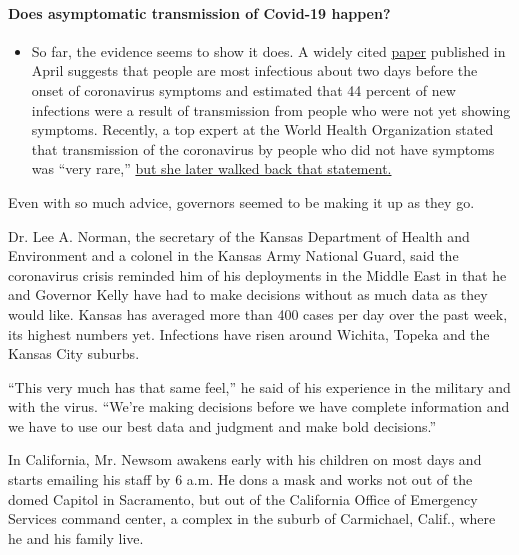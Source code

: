 \begin{itemize}
{  \paragraph{Does asymptomatic transmission of Covid-19
  happen?}\label{does-asymptomatic-transmission-of-covid-19-happen}}

  \begin{itemize}
  \tightlist
  \item
    So far, the evidence seems to show it does. A widely cited
    \href{https://www.nature.com/articles/s41591-020-0869-5}{paper}
    published in April suggests that people are most infectious about
    two days before the onset of coronavirus symptoms and estimated that
    44 percent of new infections were a result of transmission from
    people who were not yet showing symptoms. Recently, a top expert at
    the World Health Organization stated that transmission of the
    coronavirus by people who did not have symptoms was ``very rare,''
    \href{https://www.nytimes.com/2020/06/09/world/coronavirus-updates.html?action=click\&pgtype=Article\&state=default\&region=MAIN_CONTENT_3\&context=storylines_faq\#link-1f302e21}{but
    she later walked back that statement.}
  \end{itemize}
\end{itemize}

Even with so much advice, governors seemed to be making it up as they
go.

Dr. Lee A. Norman, the secretary of the Kansas Department of Health and
Environment and a colonel in the Kansas Army National Guard, said the
coronavirus crisis reminded him of his deployments in the Middle East in
that he and Governor Kelly have had to make decisions without as much
data as they would like. Kansas has averaged more than 400 cases per day
over the past week, its highest numbers yet. Infections have risen
around Wichita, Topeka and the Kansas City suburbs.

``This very much has that same feel,'' he said of his experience in the
military and with the virus. ``We're making decisions before we have
complete information and we have to use our best data and judgment and
make bold decisions.''

In California, Mr. Newsom awakens early with his children on most days
and starts emailing his staff by 6 a.m. He dons a mask and works not out
of the domed Capitol in Sacramento, but out of the California Office of
Emergency Services command center, a complex in the suburb of
Carmichael, Calif., where he and his family live.

